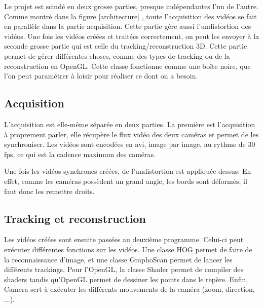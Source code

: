Le projet est scindé en deux grosse parties, presque indépendantes l'un de l'autre.
Comme montré dans la figure \ref{architecture} , toute l'acquisition des vidéos se fait en parallèle dans la partie acquisition. Cette partie gère aussi l'undistortion des vidéos. Une fois les vidéos créées et traitées correctement, on peut les envoyer à la seconde grosse partie qui est celle du tracking/reconstruction 3D. Cette partie permet de gérer différentes choses, comme des types de tracking ou de la reconstruction en OpenGL. Cette classe fonctionne comme une boîte noire, que l'on peut paramétrer à loisir pour réaliser ce dont on a besoin.

\subsection{Acquisition}
L'acquisition est elle-même séparée en deux parties. La première est l'ac\-qui\-si\-tion à proprement parler, elle récupère le flux vidéo des deux caméras et permet de les synchroniser. Les vidéos sont encodées en avi, image par image, au rythme de 30 fps, ce qui est la cadence maximum des caméras.

Une fois les vidéos synchrones créées, de l'undistortion est appliquée dessus. En effet, comme les caméras possèdent un grand angle, les bords sont déformés, il faut donc les remettre droits.

\subsection{Tracking et reconstruction}

Les vidéos créées sont ensuite passées au deuxième programme. Celui-ci peut exécuter différentes fonctions sur les vidéos. Une classe HOG permet de faire de la reconnaissance d'image, et une classe GraphoScan permet de lancer les différents trackings. Pour l'OpenGL, la classe Shader permet de compiler des shaders tandis qu'OpenGL permet de dessiner les points dans le repère. Enfin, Camera sert à exécuter les différents mouvements de la caméra (zoom, direction, ...).

